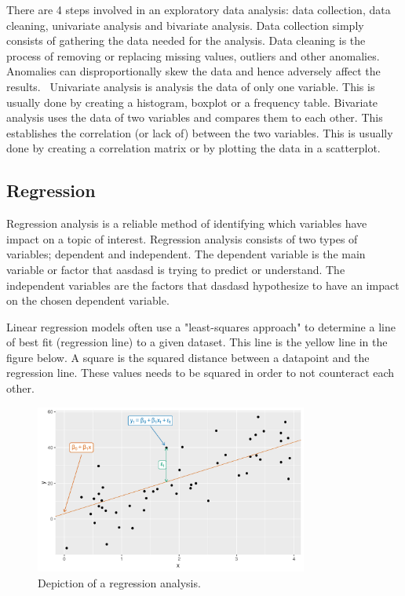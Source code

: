 There are 4 steps involved in an exploratory data analysis: data collection, data cleaning, univariate analysis and bivariate analysis. 
Data collection simply consists of gathering the data needed for the analysis. 
Data cleaning is the process of removing or replacing missing values, outliers and other anomalies. Anomalies can disproportionally skew the data and hence adversely affect the results.~\parencite{biswal_2023}
Univariate analysis is analysis the data of only one variable. This is usually done by creating a histogram, boxplot or a frequency table.  
Bivariate analysis uses the data of two variables and compares them to each other. This establishes the correlation (or lack of) between the two variables. This is usually done by creating a correlation matrix or by plotting the data in a scatterplot. 

\subsection{Regression}
Regression analysis is a reliable method of identifying which variables have impact on a topic of interest. Regression analysis consists of two types of variables; dependent and independent. The dependent variable is the main variable or factor that aasdasd is trying to predict or understand. The independent variables are the factors that dasdasd hypothesize to have an impact on the chosen dependent variable. 

Linear regression models often use a "least-squares approach" to determine a line of best fit (regression line) to a given dataset. This line is the yellow line in the figure below. A square is the squared distance between a datapoint and the regression line. These values needs to be squared in order to not counteract each other.   

\begin{figure}[H]
    \centering
    \includegraphics[width=0.8\textwidth]{data/Figures/Regression/regression_linear.png}
    \caption[Depiction of a regression analysis]{Depiction of a regression analysis.~\cite{hyndman_athanasopoulos_2021}}\label{fig:Regression}
\end{figure}

